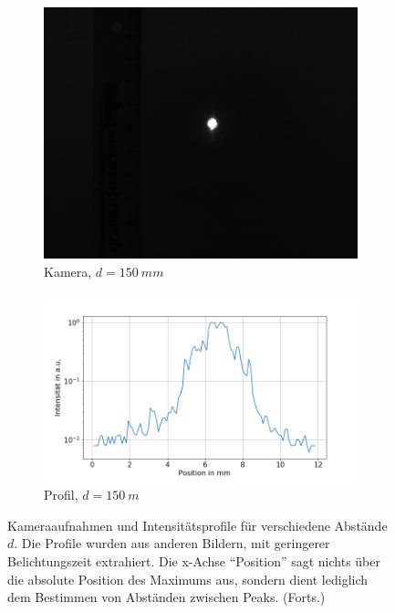 \documentclass[
	a4paper,
	12pt,
	pagesize,
	ngerman
]{scrartcl}
\begin{document}
\begin{figure}[H]
\begin{subfigure}[b]{0.4\textwidth}
            \centering
            \includegraphics[width=\textwidth]{raw/1/1_ultra_bild}
            \caption[]%
            {Kamera, $d=\SI{150}{mm}$}
            \label{fig_ultra_bild}
        \end{subfigure}
        \quad
        \begin{subfigure}[b]{0.55\textwidth}
            \centering
            \includegraphics[width=\textwidth]{img/1/1_ultra_plot}
            \caption[]%
            {Profil, $d=\SI{150}{m}$}
            \label{fig_ultra_plot}
        \end{subfigure}
        \caption%
        {
				Kameraaufnahmen und Intensitätsprofile für verschiedene Abstände $d$.
				Die Profile wurden aus anderen Bildern, mit geringerer Belichtungszeit extrahiert.
				Die x-Achse \enquote{Position} sagt nichts über die absolute Position des Maximums aus, sondern dient lediglich dem Bestimmen von Abständen zwischen Peaks. (Forts.)
				}
        \label{fig_1_mix_2}
    \end{figure}
\end{document}
